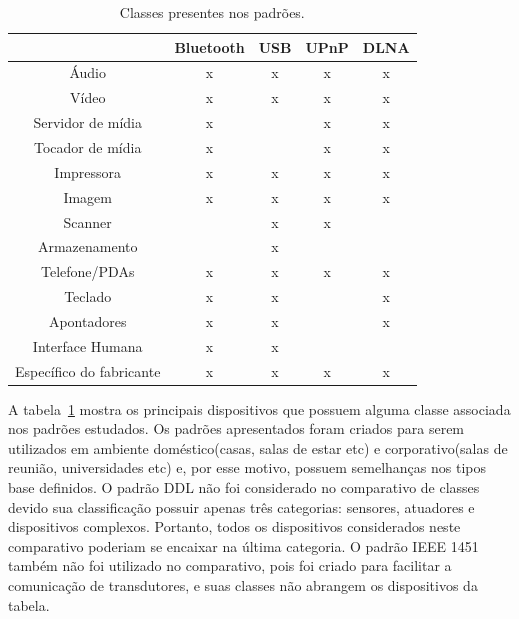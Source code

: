 \begin{table}
	\caption{Classes presentes nos padrões.}
	\begin{center}
		\begin{tabular}{|ccccc|}
		\hline
									& \textbf{Bluetooth} 	& \textbf{USB}	& \textbf{UPnP} & \textbf{DLNA}	\\
		\hline
		Áudio						& x						& x				& x 			& x				\\
		\hline
		Vídeo						& x						& x				& x				& x				\\
		\hline
		Servidor de mídia			& x						&				& x 			& x				\\
		\hline
		Tocador de mídia			& x						&				& x				& x				\\
		\hline
		Impressora 					& x						& x				& x				& x				\\
		\hline
		Imagem	 					& x						& x				& x				& x				\\
		\hline
		Scanner						& 						& x				& x				& 				\\
		\hline
		Armazenamento				&						& x				& 				& 				\\	
		\hline
		Telefone/PDAs				& x						& x				& x				& x				\\
		\hline
		Teclado						& x						& x				& 				& x				\\
		\hline
		Apontadores					& x						& x				& 				& x 			\\
		\hline
		Interface Humana		 	& x						& x				&  				&  				\\
		\hline
		Específico do fabricante 	& x 					& x				& x				& x				\\
		\hline								
		\end{tabular}
	\end{center}
	\label{tab:comparativoClasses}
\end{table}

A tabela~\ref{tab:comparativoClasses} mostra os principais dispositivos que possuem alguma classe associada nos padrões estudados. Os padrões apresentados foram criados para serem utilizados em ambiente doméstico(casas, salas de estar etc) e corporativo(salas de reunião, universidades etc) e, por esse motivo, possuem semelhanças nos tipos base definidos. O padrão DDL não foi considerado no comparativo de classes devido sua classificação possuir apenas três categorias: sensores, atuadores e dispositivos complexos. Portanto, todos os dispositivos considerados neste comparativo poderiam se encaixar na última categoria. O padrão IEEE 1451 também não foi utilizado no comparativo, pois foi criado para facilitar a comunicação de transdutores, e suas classes não abrangem os dispositivos da tabela. 
